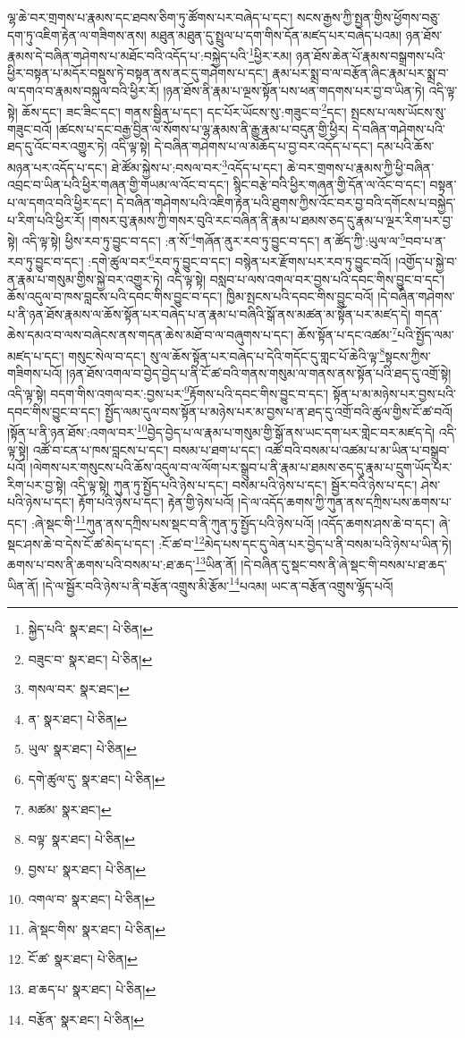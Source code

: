 ལྷ་ཆེ་བར་གྲགས་པ་རྣམས་དང་ཐབས་ཅིག་ཏུ་ཚོགས་པར་བཞེད་པ་དང་། སངས་རྒྱས་ཀྱི་སྤྱན་གྱིས་ཕྱོགས་བཅུ་དག་ཏུ་འཇིག་རྟེན་ལ་གཟིགས་ནས། མཐུན་མཐུན་དུ་སྤྲུལ་པ་དག་གིས་དོན་མཛད་པར་བཞེད་པའམ། ཉན་ཐོས་རྣམས་དེ་བཞིན་གཤེགས་པ་མཐོང་བའི་འདོད་པ་:བསྐྱེད་པའི་\footnote{སྐྱེད་པའི་  སྣར་ཐང་།  པེ་ཅིན། }ཕྱིར་རམ། ཉན་ཐོས་ཆེན་པོ་རྣམས་བསྒྲགས་པའི་ཕྱིར་བསྟན་པ་མདོར་བསྡུས་ཏེ་བསྟན་ནས་ནང་དུ་གཤེགས་པ་དང་། རྣམ་པར་སྨྲ་བ་ལ་བརྩོན་ཞིང་རྣམ་པར་སྨྲ་བ་ལ་དགའ་བ་རྣམས་བསྐུལ་བའི་ཕྱིར་རོ། །ཉན་ཐོས་ནི་རྣམ་པ་ལྔས་སྟོན་པས་ཕན་གདགས་པར་བྱ་བ་ཡིན་ཏེ། འདི་ལྟ་སྟེ། ཆོས་དང་། ཟང་ཟིང་དང་། གནས་སྦྱིན་པ་དང་། དང་པོར་ཡོངས་སུ་:གཟུང་བ་\footnote{བཟུང་བ་  སྣར་ཐང་།  པེ་ཅིན། }དང་། སྤངས་པ་ལས་ཡོངས་སུ་གཟུང་བའོ། །ཚངས་པ་དང་བརྒྱ་བྱིན་ལ་སོགས་པ་ལྷ་རྣམས་ནི་རྒྱུ་རྣམ་པ་བདུན་གྱི་ཕྱིར། དེ་བཞིན་གཤེགས་པའི་ཐད་དུ་འོང་བར་འགྱུར་ཏེ། འདི་ལྟ་སྟེ། དེ་བཞིན་གཤེགས་པ་ལ་མཆོད་པ་བྱ་བར་འདོད་པ་དང་། དམ་པའི་ཆོས་མཉན་པར་འདོད་པ་དང་། ཐེ་ཚོམ་སྐྱེས་པ་:བསལ་བར་\footnote{གསལ་བར་  སྣར་ཐང་། }འདོད་པ་དང་། ཆེ་བར་གྲགས་པ་རྣམས་ཀྱི་ཕྱི་བཞིན་འབྲང་བ་ཡིན་པའི་ཕྱིར་གཞན་གྱི་གཡམ་ལ་འོང་བ་དང་། སྙིང་བརྩེ་བའི་ཕྱིར་གཞན་གྱི་དོན་ལ་འོང་བ་དང་། བསྟན་པ་ལ་དགའ་བའི་ཕྱིར་དང་། དེ་བཞིན་གཤེགས་པའི་འཇིག་རྟེན་པའི་ཐུགས་ཀྱིས་འོང་བར་བྱ་བའི་དགོངས་པ་བསྐྱེད་པ་རིག་པའི་ཕྱིར་རོ། །གསར་བུ་རྣམས་ཀྱི་གསར་བུའི་རང་བཞིན་ནི་རྣམ་པ་ཐམས་ཅད་དུ་རྣམ་པ་ལྔར་རིག་པར་བྱ་སྟེ། འདི་ལྟ་སྟེ། ཕྱིས་རབ་ཏུ་བྱུང་བ་དང་། :ན་སོ་\footnote{ན་  སྣར་ཐང་།  པེ་ཅིན། }གཞོན་ནུར་རབ་ཏུ་བྱུང་བ་དང་། ན་ཚོད་ཀྱི་:ཡུལ་ལ་\footnote{ཡུལ་  སྣར་ཐང་།  པེ་ཅིན། }བབ་པ་ན་རབ་ཏུ་བྱུང་བ་དང་། :དགེ་ཚུལ་བར་\footnote{དགེ་ཚུལ་དུ་  སྣར་ཐང་།  པེ་ཅིན། }རབ་ཏུ་བྱུང་བ་དང་། བསྙེན་པར་རྫོགས་པར་རབ་ཏུ་བྱུང་བའོ། །འགྱོད་པ་སྐྱེ་བ་ན་རྣམ་པ་གསུམ་གྱིས་སྐྱེ་བར་འགྱུར་ཏེ། འདི་ལྟ་སྟེ། བསླབ་པ་ལས་འགལ་བར་བྱས་པའི་དབང་གིས་བྱུང་བ་དང་། ཆོས་འདུལ་བ་ཁས་བླངས་པའི་དབང་གིས་བྱུང་བ་དང་། ཁྱིམ་སྤངས་པའི་དབང་གིས་བྱུང་བའོ། །དེ་བཞིན་གཤེགས་པ་ནི་ཉན་ཐོས་རྣམས་ལ་ཆོས་སྟོན་པར་བཞེད་པ་ན་རྣམ་པ་བཞིའི་སྒོ་ནས་མཚན་མ་སྟོན་པར་མཛད་དེ། གདན་ཆེས་དམའ་བ་ལས་བཞེངས་ནས་གདན་ཆེས་མཐོ་བ་ལ་བཞུགས་པ་དང་། ཆོས་སྟོན་པ་དང་འཚམ་\footnote{མཚམ་  སྣར་ཐང་། }པའི་སྤྱོད་ལམ་མཛད་པ་དང་། གསུང་སེལ་བ་དང་། སུ་ལ་ཆོས་སྟོན་པར་བཞེད་པ་དེའི་གདོང་དུ་གླང་པོ་ཆེའི་ལྟ་\footnote{བལྟ་  སྣར་ཐང་།  པེ་ཅིན། }སྟངས་ཀྱིས་གཟིགས་པའོ། །ཉན་ཐོས་འགལ་བ་བྱེད་བྱེད་པ་ནི་ངོ་ཚ་བའི་གནས་གསུམ་ལ་གནས་ནས་སྟོན་པའི་ཐད་དུ་འགྲོ་སྟེ། འདི་ལྟ་སྟེ། བདག་གིས་འགལ་བར་:བྱས་པར་\footnote{བྱས་པ་  སྣར་ཐང་།  པེ་ཅིན། }རྟོགས་པའི་དབང་གིས་བྱུང་བ་དང་། སྟོན་པ་མ་མཉེས་པར་བྱས་པའི་དབང་གིས་བྱུང་བ་དང་། སྤྱོད་ལམ་དུལ་བས་སྟོན་པ་མཉེས་པར་མ་བྱས་པ་ན་ཐད་དུ་འགྲོ་བའི་ཚུལ་གྱིས་ངོ་ཚ་བའོ། །སྟོན་པ་ནི་ཉན་ཐོས་:འགལ་བར་\footnote{འགལ་བ་  སྣར་ཐང་།  པེ་ཅིན། }བྱེད་བྱེད་པ་ལ་རྣམ་པ་གསུམ་གྱི་སྒོ་ནས་ཡང་དག་པར་གླེང་བར་མཛད་དེ། འདི་ལྟ་སྟེ། འཚོ་བ་ངན་པ་ཁས་བླངས་པ་དང་། བསམ་པ་ཐག་པ་དང་། འཚོ་བའི་བསམ་པ་འཚམ་པ་མ་ཡིན་པ་བསྒྲུབ་པའོ། །ལེགས་པར་གསུངས་པའི་ཆོས་འདུལ་བ་ལ་ལོག་པར་སྒྲུབ་པ་ནི་རྣམ་པ་ཐམས་ཅད་དུ་རྣམ་པ་དྲུག་ཡོད་པར་རིག་པར་བྱ་སྟེ། འདི་ལྟ་སྟེ། ཀུན་ཏུ་སྤྱོད་པའི་ཉེས་པ་དང་། བསམ་པའི་ཉེས་པ་དང་། སྦྱོར་བའི་ཉེས་པ་དང་། ཤེས་པའི་ཉེས་པ་དང་། རྟོག་པའི་ཉེས་པ་དང་། རྟེན་གྱི་ཉེས་པའོ། །དེ་ལ་འདོད་ཆགས་ཀྱི་ཀུན་ནས་དཀྲིས་པས་ཆགས་པ་དང་། :ཞེ་སྡང་གི་\footnote{ཞེ་སྡང་གིས་  སྣར་ཐང་།  པེ་ཅིན། }ཀུན་ནས་དཀྲིས་པས་སྡང་བ་ནི་ཀུན་ཏུ་སྤྱོད་པའི་ཉེས་པའོ། །འདོད་ཆགས་ཤས་ཆེ་བ་དང་། ཞེ་སྡང་ཤས་ཆེ་བ་དེས་ངོ་ཚ་མེད་པ་དང་། :ངོ་ཚ་བ་\footnote{ངོ་ཚ་  སྣར་ཐང་།  པེ་ཅིན། }མེད་པས་དང་དུ་ལེན་པར་བྱེད་པ་ནི་བསམ་པའི་ཉེས་པ་ཡིན་ཏེ། ཆགས་པ་བས་ནི་ཆགས་པའི་བསམ་པ་:ཐ་ཆད་\footnote{ཐ་ཆད་པ་  སྣར་ཐང་།  པེ་ཅིན། }ཡིན་ནོ། །དེ་བཞིན་དུ་སྡང་བས་ནི་ཞེ་སྡང་གི་བསམ་པ་ཐ་ཆད་ཡིན་ནོ། །དེ་ལ་སྦྱོར་བའི་ཉེས་པ་ནི་བརྩོན་འགྲུས་མི་རྩོམ་\footnote{བརྩོན་  སྣར་ཐང་།  པེ་ཅིན། }པའམ། ཡང་ན་བརྩོན་འགྲུས་ལྷོད་པའོ། 